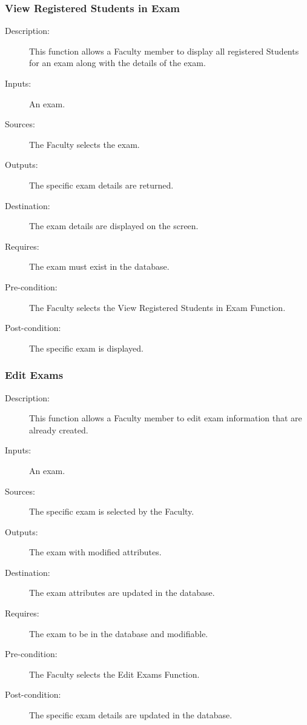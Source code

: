 \subsubsection{\large View Registered Students in Exam} 
\begin{boxed} %
\begin{description}
\item[Description:]
   This function allows a Faculty member to display all registered Students for
   an exam along with the details of the exam.
\item[Inputs:]
   An exam.
\item[Sources:]
   The Faculty selects the exam.
\item[Outputs:]
   The specific exam details are returned.
\item[Destination:]
   The exam details are displayed on the screen.
\item[Requires:]
   The exam must exist in the database.
\item[Pre-condition:]
   The Faculty selects the View Registered Students in Exam Function.
\item[Post-condition:]
   The specific exam is displayed.
\end{description}
\end{boxed} %

\subsubsection{\large Edit Exams} 
\begin{boxed} %
\begin{description}
\item[Description:]
   This function allows a Faculty member to edit exam information that are
   already created.
\item[Inputs:]
   An exam.
\item[Sources:]
   The specific exam is selected by the Faculty.
\item[Outputs:]
   The exam with modified attributes.
\item[Destination:]
   The exam attributes are updated in the database.
\item[Requires:]
   The exam to be in the database and modifiable.
\item[Pre-condition:]
   The Faculty selects the Edit Exams Function.
\item[Post-condition:]
   The specific exam details are updated in the database.
\end{description}
\end{boxed} %

